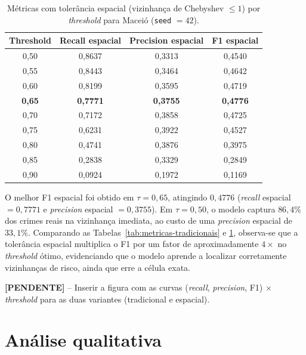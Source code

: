 \begin{table}[htb]
\centering
\caption{Métricas com tolerância espacial (vizinhança de Chebyshev $\leq 1$) por \textit{threshold} para Maceió (\texttt{seed} $= 42$).}
\label{tab:metricas-espaciais}
\begin{tabular}{cccc}
\hline
\textbf{Threshold} & \textbf{Recall espacial} & \textbf{Precision espacial} & \textbf{F1 espacial} \\
\hline
0{,}50 & 0{,}8637 & 0{,}3313 & 0{,}4540 \\
0{,}55 & 0{,}8443 & 0{,}3464 & 0{,}4642 \\
0{,}60 & 0{,}8199 & 0{,}3595 & 0{,}4719 \\
\textbf{0{,}65} & \textbf{0{,}7771} & \textbf{0{,}3755} & \textbf{0{,}4776} \\
0{,}70 & 0{,}7172 & 0{,}3858 & 0{,}4725 \\
0{,}75 & 0{,}6231 & 0{,}3922 & 0{,}4527 \\
0{,}80 & 0{,}4741 & 0{,}3876 & 0{,}3975 \\
0{,}85 & 0{,}2838 & 0{,}3329 & 0{,}2849 \\
0{,}90 & 0{,}0924 & 0{,}1972 & 0{,}1169 \\
\hline
\end{tabular}
\end{table}

O melhor F1 espacial foi obtido em $\tau = 0{,}65$, atingindo $0{,}4776$ (\textit{recall} espacial $= 0{,}7771$ e \textit{precision} espacial $= 0{,}3755$). Em $\tau = 0{,}50$, o modelo captura $86{,}4\%$ dos crimes reais na vizinhança imediata, ao custo de uma \textit{precision} espacial de $33{,}1\%$. Comparando as Tabelas~\ref{tab:metricas-tradicionais} e \ref{tab:metricas-espaciais}, observa-se que a tolerância espacial multiplica o F1 por um fator de aproximadamente $4\times$ no \textit{threshold} ótimo, evidenciando que o modelo aprende a localizar corretamente vizinhanças de risco, ainda que erre a célula exata.

\textbf{[PENDENTE]} -- Inserir a figura com as curvas (\textit{recall}, \textit{precision}, F1) $\times$ \textit{threshold} para as duas variantes (tradicional e espacial).

\section{Análise qualitativa}
\label{Sec:AnaliseQualitativa}

